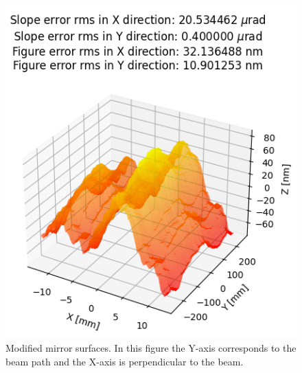 \begin{figure}[!htb]
\endminipage\hfill
{}%
  \includegraphics[width=\linewidth]{./../figures/slope_error/surface_error_profile_500x25_04x20urad.png}
\endminipage
\caption{\label{fig:fractals} Modified mirror surfaces. In this figure the Y-axis corresponds to the beam path and the X-axis is perpendicular to the beam. }
\end{figure}
